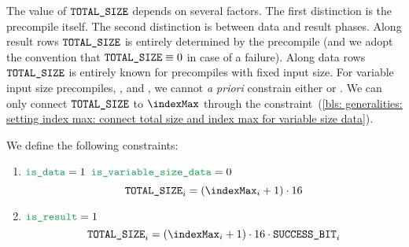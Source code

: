 The value of $\texttt{TOTAL\_SIZE}$ depends on several factors.
The first distinction is the precompile itself.
The second distinction is between data and result phases.
Along result rows $\texttt{TOTAL\_SIZE}$ is entirely determined by the precompile (and we adopt the convention that $\texttt{TOTAL\_SIZE} \equiv 0$ in case of a failure).
Along data rows $\texttt{TOTAL\_SIZE}$ is entirely known for precompiles with fixed input size.
For variable input size precompiles, \inst{\prcNameBlsGOneMsm}, \inst{\prcNameBlsGTwoMsm} and \inst{\prcNameBlsPairingCheck}, we cannot \emph{a priori} constrain either \blsTotalSize{} or \indexMax{}.
We can only connect $\texttt{TOTAL\_SIZE}$ to $\indexMax$ through the constraint~(\ref{bls: generalities: setting index max: connect total size and index max for variable size data}).

We define the following constraints:
\begin{enumerate}
  \item \If $\locIsData = 1$ \et $\locIsVariableSizeData = 0$ \Then
    \[
        \blsTotalSize _{i} = (\indexMax _{i} + 1) \cdot 16
    \]
  \item \If $\locIsResult = 1$ \Then
    \[
        \blsTotalSize _{i} = (\indexMax _{i} + 1) \cdot 16 \cdot \blsSuccessBit _{i}
    \]
\end{enumerate}